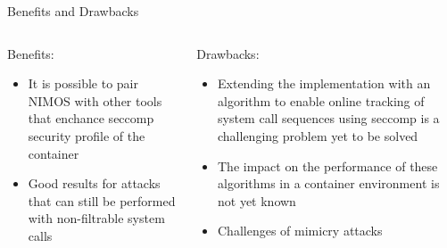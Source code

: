 \documentclass{beamer}
\begin{document}
\begin{frame}{Benefits and Drawbacks}
\begin{columns}
\begin{column}{0.5\textwidth}
Benefits:
\begin{itemize}
    \item[\textcolor{newgreen}{\textbullet}] It is possible to pair NIMOS with other tools that enchance seccomp security profile of the container
    \item[\textcolor{newgreen}{\textbullet}] Good results for attacks that can still be performed with non-filtrable system calls
\end{itemize}
\end{column}
\begin{column}{0.5\textwidth}
Drawbacks:
\begin{itemize}
    \item[\textcolor{newred}{\textbullet}] Extending the implementation with an algorithm to enable online tracking of system call sequences using seccomp is a challenging problem yet to be solved
    \item[\textcolor{newred}{\textbullet}] The impact on the performance of these algorithms in a container environment is not yet known
    \item[\textcolor{newred}{\textbullet}] Challenges of mimicry attacks%
\end{itemize}
\end{column}
\end{columns}
\end{frame}

\backmatter
\end{document}
